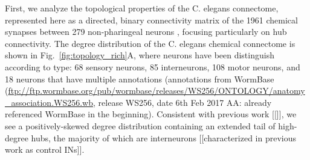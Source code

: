 \documentclass[10pt,letterpaper]{article}
\begin{document}

First, we analyze the topological properties of the C. elegans connectome, represented here as a directed, binary connectivity matrix of the 1961 chemical synapses between 279 non-pharingeal neurons \cite{Varshney2011}, focusing particularly on hub connectivity.
The degree distribution of the C. elegans chemical connectome is shown in Fig.~\ref{fig:topology_rich}A, where neurons have been distinguish according to type: 68 sensory neurons, 85 interneurons, 108 motor neurons, and 18 neurons that have multiple annotations (annotations from WormBase (\url{ftp://ftp.wormbase.org/pub/wormbase/releases/WS256/ONTOLOGY/anatomy_association.WS256.wb}, release WS256, date 6th Feb 2017 AA: already referenced WormBase in the beginning). 
Consistent with previous work [[]], we see a positively-skewed degree distribution containing an extended tail of high-degree hubs, the majority of which are interneurons [[characterized in previous work as control INs]].
\end{document}
